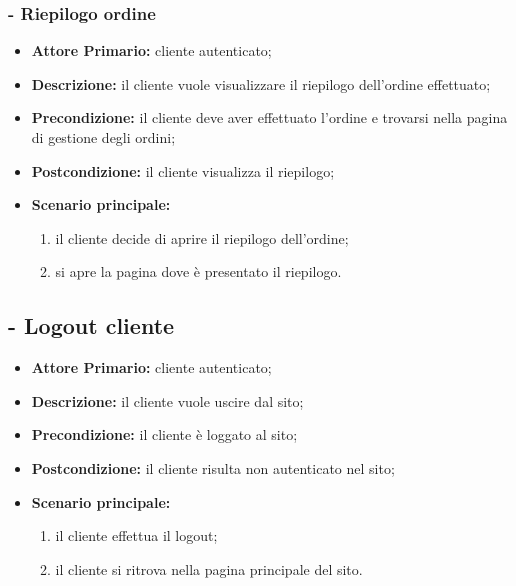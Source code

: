 \stepsubUserCase
\subsubsection{ - Riepilogo ordine}
\begin{itemize}
\item \textbf{Attore Primario:} cliente autenticato;
\item \textbf{Descrizione:} il cliente vuole visualizzare il riepilogo dell'ordine effettuato;
\item \textbf{Precondizione:} il cliente deve aver effettuato l'ordine e trovarsi nella pagina di gestione degli ordini;
\item \textbf{Postcondizione:} il cliente visualizza il riepilogo;
\item \textbf{Scenario principale:}
\begin{enumerate}
    \item il cliente decide di aprire il riepilogo dell'ordine;
    \item si apre la pagina dove è presentato il riepilogo.
\end{enumerate}
\end{itemize}

\stepUserCase
\subsection{ - Logout cliente}
\begin{itemize}
    \item \textbf{Attore Primario:} cliente autenticato;
    \item \textbf{Descrizione:} il cliente vuole uscire dal sito;
    \item \textbf{Precondizione:} il cliente è loggato al sito;
    \item \textbf{Postcondizione:} il cliente risulta non autenticato nel sito;
    \item \textbf{Scenario principale:}
    \begin{enumerate}
        \item il cliente effettua il logout;
        \item il cliente si ritrova nella pagina principale del sito.
    \end{enumerate}
\end{itemize}

\stepUserCase
